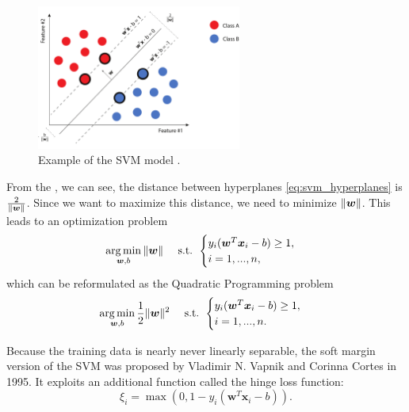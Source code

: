 \begin{figure}[ht!]
    \centering
    \includegraphics[width=0.6\textwidth]{Figures/svm/hyperplane_svm.pdf}
    \caption[Example of the SVM model]{Example of the SVM model \cite{Kruzik2018}.}
    \label{fig:svm-margin}
\end{figure}

From the , we can see, the distance between hyperplanes \eqref{eq:svm_hyperplanes} is \( \frac{2}{\left\lVert\boldsymbol{w}\right\rVert} \). Since we want to maximize this distance, we need to minimize $\left\lVert\boldsymbol{w}\right\rVert$. This leads to an optimization problem
\begin{equation}
    \operatorname*{arg\,min}_{\boldsymbol{w},b} \|\boldsymbol{w}\|\quad \text{ s.t. }
    \begin{cases}
        y_i(\boldsymbol{w}^T\boldsymbol{x}_i-b)\geq1,\\
        i=1, ...,n,
    \end{cases}
\end{equation}
which can be reformulated as the Quadratic Programming problem
\begin{equation}
    \operatorname*{arg\,min}_{\boldsymbol{w},b} \frac{1}{2}\|\boldsymbol{w}\|^2\quad \text{ s.t. }
    \begin{cases}
        y_i(\boldsymbol{w}^T\boldsymbol{x}_i-b)\geq1,\\
        i=1, ...,n.
    \end{cases}
    \label{eq:svm_hard_margin_minimization}
\end{equation}

Because the training data is nearly never linearly separable, the soft margin version of the SVM was proposed by Vladimir N. Vapnik and Corinna Cortes \cite{Cortes1995} in 1995. It exploits an additional function called the hinge loss function:
\begin{equation}
    \xi_i = \max(0, 1-y_i(\boldsymbol{w}^T\boldsymbol{x}_i-b)).
    \label{eq:svm_hinge_loss}
\end{equation}

